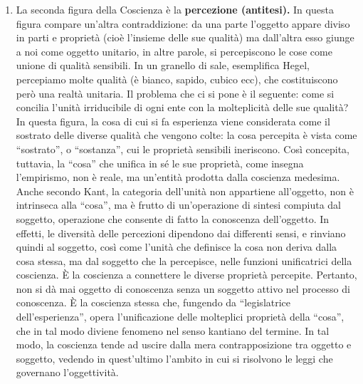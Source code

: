 \documentclass[a4paper,12pt,oneside,openany]{book}%
\begin{document}
\begin{enumerate}
	\item La seconda figura della Coscienza è la \textbf{percezione (antitesi).} In questa figura compare un’altra contraddizione: da una parte l’oggetto appare diviso in parti e proprietà (cioè l’insieme delle sue qualità) ma dall’altra esso giunge a noi come oggetto unitario, in altre parole, si percepiscono le cose come unione di qualità sensibili. In un granello di sale, esemplifica Hegel, percepiamo molte qualità (è bianco, sapido, cubico ecc), che costituiscono però una realtà unitaria. Il problema che ci si pone è il seguente: come si concilia l’unità irriducibile di ogni ente con la molteplicità delle sue qualità? In questa figura, la cosa di cui si fa esperienza viene considerata come il sostrato delle diverse qualità che vengono colte: la cosa percepita è vista come “sostrato”, o “sostanza”, cui le proprietà sensibili ineriscono. Così concepita, tuttavia, la “cosa” che unifica in sé le sue proprietà, come insegna l’empirismo, non è reale, ma un’entità prodotta dalla coscienza medesima. Anche secondo Kant, la categoria dell’unità non appartiene all’oggetto, non è intrinseca alla “cosa”, ma è frutto di un’operazione di sintesi compiuta dal soggetto, operazione che consente di fatto la conoscenza dell’oggetto. In effetti, le diversità delle percezioni dipendono dai differenti sensi, e rinviano quindi al soggetto, così come l’unità che definisce la cosa non deriva dalla cosa stessa, ma dal soggetto che la percepisce, nelle funzioni unificatrici della coscienza. È la coscienza a connettere le diverse proprietà percepite. Pertanto, non si dà mai oggetto di conoscenza senza un soggetto attivo nel processo di conoscenza. È la coscienza stessa che, fungendo da “legislatrice dell’esperienza”, opera l’unificazione delle molteplici proprietà della “cosa”, che in tal modo diviene fenomeno nel senso kantiano del termine. In tal modo, la coscienza tende ad uscire dalla mera contrapposizione tra oggetto e soggetto, vedendo in quest’ultimo l’ambito in cui si risolvono le leggi che governano l’oggettività.

\end{enumerate}
\end{document}
